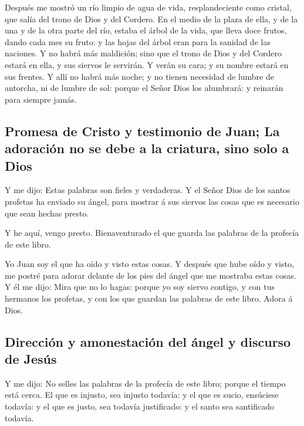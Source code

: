  Después me mostró un río limpio de agua de vida,
resplandeciente como cristal, que salía del trono de Dios y del Cordero.
 En el medio de la plaza de ella, y de la una y de la otra
parte del río, estaba el árbol de la vida, que lleva doce frutos, dando
cada mes su fruto: y las hojas del árbol eran para la sanidad de las
naciones.  Y no habrá más maldición; sino que el trono de
Dios y del Cordero estará en ella, y sus siervos le servirán.
 Y verán su cara; y su nombre estará en sus frentes.
 Y allí no habrá más noche; y no tienen necesidad de
lumbre de antorcha, ni de lumbre de sol: porque el Señor Dios los
alumbrará: y reinarán para siempre jamás.

\hypertarget{promesa-de-cristo-y-testimonio-de-juan-la-adoraciuxf3n-no-se-debe-a-la-criatura-sino-solo-a-dios}{%
\subsection{Promesa de Cristo y testimonio de Juan; La adoración no se
debe a la criatura, sino solo a
Dios}\label{promesa-de-cristo-y-testimonio-de-juan-la-adoraciuxf3n-no-se-debe-a-la-criatura-sino-solo-a-dios}}

 Y me dijo: Estas palabras son fieles y verdaderas. Y el
Señor Dios de los santos profetas ha enviado su ángel, para mostrar á
sus siervos las cosas que es necesario que sean hechas presto.

 Y he aquí, vengo presto. Bienaventurado el que guarda las
palabras de la profecía de este libro.

 Yo Juan soy el que ha oído y visto estas cosas. Y después
que hube oído y visto, me postré para adorar delante de los pies del
ángel que me mostraba estas cosas.  Y él me dijo: Mira que
no lo hagas: porque yo soy siervo contigo, y con tus hermanos los
profetas, y con los que guardan las palabras de este libro. Adora á
Dios.

\hypertarget{direcciuxf3n-y-amonestaciuxf3n-del-uxe1ngel-y-discurso-de-jesuxfas}{%
\subsection{Dirección y amonestación del ángel y discurso de
Jesús}\label{direcciuxf3n-y-amonestaciuxf3n-del-uxe1ngel-y-discurso-de-jesuxfas}}

 Y me dijo: No selles las palabras de la profecía de este
libro; porque el tiempo está cerca.  El que es injusto,
sea injusto todavía: y el que es sucio, ensúciese todavía: y el que es
justo, sea todavía justificado: y el santo sea santificado todavía.

